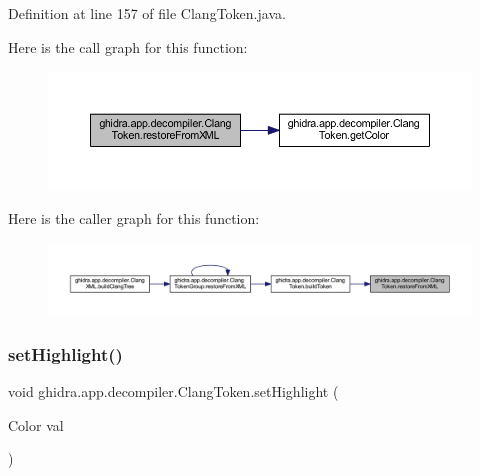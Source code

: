 Definition at line 157 of file Clang\+Token.\+java.

Here is the call graph for this function\+:
\nopagebreak
\begin{figure}[H]
\begin{center}
\leavevmode
\includegraphics[width=350pt]{classghidra_1_1app_1_1decompiler_1_1_clang_token_a3236274b52425653a2986ada2874fa99_cgraph}
\end{center}
\end{figure}
Here is the caller graph for this function\+:
\nopagebreak
\begin{figure}[H]
\begin{center}
\leavevmode
\includegraphics[width=350pt]{classghidra_1_1app_1_1decompiler_1_1_clang_token_a3236274b52425653a2986ada2874fa99_icgraph}
\end{center}
\end{figure}
\mbox{\label{classghidra_1_1app_1_1decompiler_1_1_clang_token_abc4aa5a1ad389a7bc71377aee25048e0}} 
\subsubsection{\texorpdfstring{setHighlight()}{setHighlight()}}
{\footnotesize\ttfamily void ghidra.\+app.\+decompiler.\+Clang\+Token.\+set\+Highlight (\begin{DoxyParamCaption}\item[{Color}]{val }\end{DoxyParamCaption})\hspace{0.3cm}{\ttfamily [inline]}}



